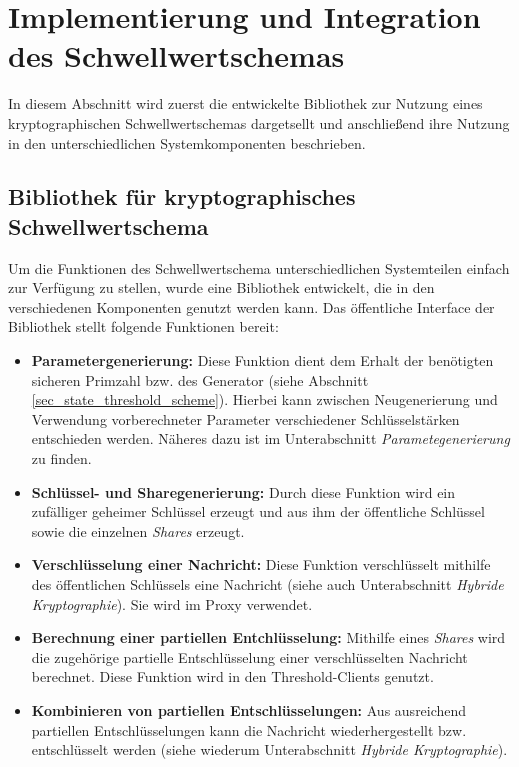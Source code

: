 \section{Implementierung und Integration des Schwellwertschemas}

\label{sec_impl_threshold}

In diesem Abschnitt wird zuerst die entwickelte Bibliothek zur Nutzung eines kryptographischen Schwellwertschemas dargetsellt und anschließend ihre Nutzung in den unterschiedlichen Systemkomponenten beschrieben.

\subsection{Bibliothek für kryptographisches Schwellwertschema}

%

Um die Funktionen des Schwellwertschema unterschiedlichen Systemteilen einfach zur Verfügung zu stellen, wurde eine Bibliothek entwickelt, die in den verschiedenen Komponenten genutzt werden kann. Das öffentliche Interface der Bibliothek stellt folgende Funktionen bereit:

\begin{itemize}
  \item \textbf{Parametergenerierung: } Diese Funktion dient dem Erhalt der benötigten sicheren Primzahl bzw. des Generator (siehe Abschnitt \ref{sec_state_threshold_scheme}). Hierbei kann zwischen Neugenerierung und Verwendung vorberechneter Parameter verschiedener Schlüsselstärken entschieden werden. Näheres dazu ist im Unterabschnitt \textit{Parametegenerierung} zu finden.
  \item \textbf{Schlüssel- und Sharegenerierung: } Durch diese Funktion wird ein zufälliger geheimer Schlüssel erzeugt und aus ihm der öffentliche Schlüssel sowie die einzelnen \textit{Shares} erzeugt. 
  \item \textbf{Verschlüsselung einer Nachricht: } Diese Funktion verschlüsselt mithilfe des öffentlichen Schlüssels eine Nachricht (siehe auch Unterabschnitt \textit{Hybride Kryptographie}). Sie wird im Proxy verwendet.
  \item \textbf{Berechnung einer partiellen Entchlüsselung: } Mithilfe eines \textit{Shares} wird die zugehörige partielle Entschlüsselung einer verschlüsselten Nachricht berechnet. Diese Funktion wird in den Threshold-Clients genutzt.
  \item \textbf{Kombinieren von partiellen Entschlüsselungen: } Aus ausreichend partiellen Entschlüsselungen kann die Nachricht wiederhergestellt bzw. entschlüsselt werden (siehe wiederum Unterabschnitt \textit{Hybride Kryptographie}).
\end{itemize}

